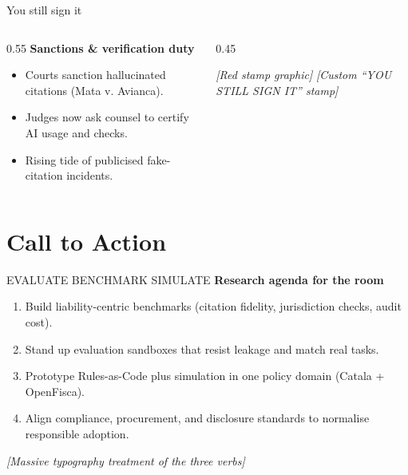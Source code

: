 \documentclass[10pt, aspectratio=169]{beamer}
\newcommand{\placeholder}[1]{\textit{[#1]}}
\begin{document}
\begin{frame}{You still sign it}
  \begin{columns}[T]
    \begin{column}{0.55\textwidth}
      \textbf{Sanctions \& verification duty}
      \begin{itemize}
        \item Courts sanction hallucinated citations (Mata v. Avianca).
        \item Judges now ask counsel to certify AI usage and checks.
        \item Rising tide of publicised fake-citation incidents.
      \end{itemize}
    \end{column}
    \begin{column}{0.45\textwidth}
      \begin{block}{\placeholder{Red stamp graphic}}
        \centering
        \placeholder{Custom ``YOU STILL SIGN IT'' stamp}
      \end{block}
    \end{column}
  \end{columns}
  \vfill
  \small \parencite{mata_v_avianca,washingtonpost_hallucinations,businessinsider_fakecites}
\end{frame}

\section{Call to Action}

\begin{frame}{EVALUATE \textbullet{} BENCHMARK \textbullet{} SIMULATE}
  \textbf{Research agenda for the room}
  \vspace{1em}
  \begin{enumerate}
    \item Build liability-centric benchmarks (citation fidelity, jurisdiction checks, audit cost).
    \item Stand up evaluation sandboxes that resist leakage and match real tasks.
    \item Prototype Rules-as-Code plus simulation in one policy domain (Catala + OpenFisca).
    \item Align compliance, procurement, and disclosure standards to normalise responsible adoption.
  \end{enumerate}
  \vfill
  \begin{center}
    \placeholder{Massive typography treatment of the three verbs}
  \end{center}
  \vfill
  \small \parencite{legalbench_site,lexglue_paper,catala,openfisca}
\end{frame}
\end{document}
